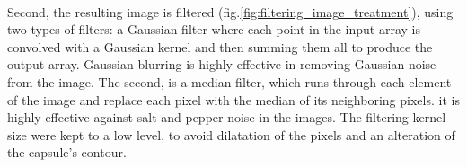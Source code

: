 \paragraph{}
Second, the resulting image is filtered (fig.\ref{fig:filtering_image_treatment}), using two types of filters: a Gaussian filter where each point in the input array is convolved with a Gaussian kernel and then summing them all to produce the output array. Gaussian blurring is highly effective in removing Gaussian noise from the image. The second, is a median filter, which runs through each element of the image and replace each pixel with the median of its neighboring pixels. it is highly effective against salt-and-pepper noise in the images.
The filtering kernel size were kept to a low level, to avoid dilatation of the pixels and an alteration of the capsule's contour.

